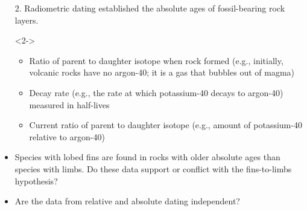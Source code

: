 \begin{frame}[t]
    \begin{adjustwidth}{-2em}{-1.5em}

        \begin{itemize}
            \item[2.] Radiometric dating established the absolute ages of
                fossil-bearing rock layers.

            \begin{uncoverenv}<2->
            \begin{itemize}
                \item Ratio of parent to daughter isotope when rock formed
                    (e.g., initially, volcanic rocks have no argon-40; it is a
                    gas that bubbles out of magma)

                \item Decay rate (e.g., the rate at which potassium-40 decays
                    to argon-40) measured in half-lives

                \item Current ratio of parent to daughter isotope (e.g., amount
                    of potassium-40 relative to argon-40)
            \end{itemize}
            \end{uncoverenv}

            \item<3-> Species with lobed fins are found in rocks with older
                absolute ages than species with limbs. Do these data support or
                conflict with the fins-to-limbs hypothesis?


            \item<4->{Are the data from relative and absolute dating
                    independent?}
                
        \end{itemize}

    \end{adjustwidth}
\end{frame}

